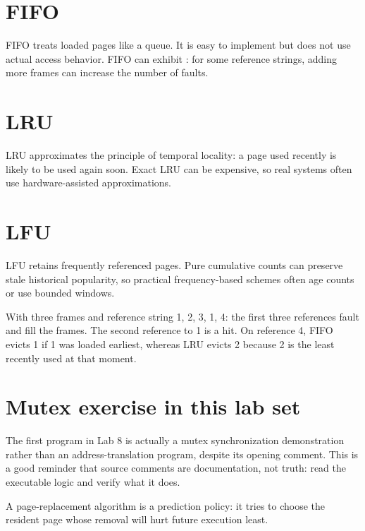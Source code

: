 \section{FIFO}
FIFO treats loaded pages like a queue. It is easy to implement but does not use actual access behavior. FIFO can exhibit : for some reference strings, adding more frames can increase the number of faults.

\section{LRU}
LRU approximates the principle of temporal locality: a page used recently is likely to be used again soon. Exact LRU can be expensive, so real systems often use hardware-assisted approximations.

\section{LFU}
LFU retains frequently referenced pages. Pure cumulative counts can preserve stale historical popularity, so practical frequency-based schemes often age counts or use bounded windows.

\begin{workedexample}
With three frames and reference string 1, 2, 3, 1, 4: the first three references fault and fill the frames. The second reference to 1 is a hit. On reference 4, FIFO evicts 1 if 1 was loaded earliest, whereas LRU evicts 2 because 2 is the least recently used at that moment.
\end{workedexample}

\section{Mutex exercise in this lab set}
The first program in Lab 8 is actually a mutex synchronization demonstration rather than an address-translation program, despite its opening comment. This is a good reminder that source comments are documentation, not truth: read the executable logic and verify what it does.

\begin{keyidea}
A page-replacement algorithm is a prediction policy: it tries to choose the resident page whose removal will hurt future execution least.
\end{keyidea}





